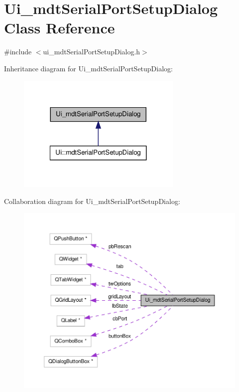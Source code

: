 \hypertarget{class_ui__mdt_serial_port_setup_dialog}{\section{Ui\-\_\-mdt\-Serial\-Port\-Setup\-Dialog Class Reference}
\label{class_ui__mdt_serial_port_setup_dialog}
}


{\ttfamily \#include $<$ui\-\_\-mdt\-Serial\-Port\-Setup\-Dialog.\-h$>$}



Inheritance diagram for Ui\-\_\-mdt\-Serial\-Port\-Setup\-Dialog\-:\nopagebreak
\begin{figure}[H]
\begin{center}
\leavevmode
\includegraphics[width=224pt]{class_ui__mdt_serial_port_setup_dialog__inherit__graph}
\end{center}
\end{figure}


Collaboration diagram for Ui\-\_\-mdt\-Serial\-Port\-Setup\-Dialog\-:\nopagebreak
\begin{figure}[H]
\begin{center}
\leavevmode
\includegraphics[width=350pt]{class_ui__mdt_serial_port_setup_dialog__coll__graph}
\end{center}
\end{figure}
